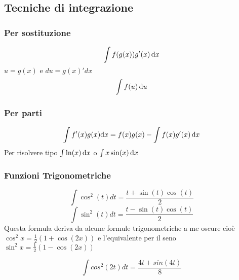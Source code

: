 \subsection{Tecniche di integrazione}
\subsubsection{Per sostituzione}
\begin{equation*}
	\int f(g(x)) g'(x)\,\mathrm{d} x
\end{equation*}
$u=g(x) \text{ e }du = g(x)'dx$
\begin{equation*}
	\int f(u) \,\mathrm{d} u
\end{equation*}
\subsubsection{Per parti}
\begin{equation}
	\int f'(x) g(x) \mathrm{d}x = f(x)g(x) - \int f(x) g'(x)\,\mathrm{d} x
\end{equation}
Per risolvere tipo $\int \ln(x) \,\mathrm{d} x$ o $\int x \sin(x) \,\mathrm{d} x$

\subsubsection{Funzioni Trigonometriche}

\begin{equation}
	\int \cos^2(t)dt = \frac{t+\sin(t)\cos(t)}{2}
\end{equation}
\begin{equation}
	\int \sin^2(t)dt = \frac{t-\sin(t)\cos(t)}{2}
\end{equation}
Questa formula deriva da alcune formule trigonometriche a me oscure cioè $\cos^2x = \frac{1}{2} (1+\cos(2x))$ e l'equivalente per il seno $\sin^2x=\frac{1}{2}(1-\cos(2x))$

\begin{equation}
	\int cos^2(2t)dt = \frac{4t+sin(4t)}{8}
\end{equation}
